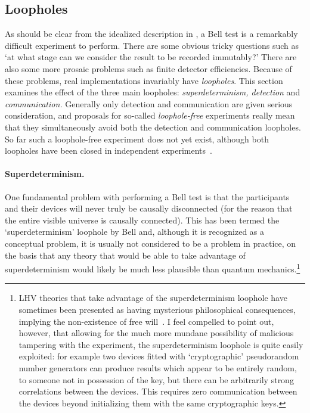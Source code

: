 \subsection{Loopholes}\label{sec:loopholes}
As should be clear from the idealized description in , a Bell test is a remarkably difficult experiment to perform. There are some obvious tricky questions such as `at what stage can we consider the result to be recorded immutably?' There are also some more prosaic problems such as finite detector efficiencies. Because of these problems, real implementations invariably have \emph{loopholes}. This section examines the effect of the three main loopholes: \emph{superdeterminism, detection} and \emph{communication.} Generally only detection and communication are given serious consideration, and proposals for so-called \emph{loophole-free} experiments really mean that they simultaneously avoid both the detection and communication loopholes. So far such a loophole-free experiment does not yet exist, although both loopholes have been closed in independent experiments~\cite{rowe_experimental_2001, weihs_violation_1998}.

\paragraph{Superdeterminism.} One fundamental problem with performing a Bell test is that the participants and their devices will never truly be causally disconnected (for the reason that the entire visible universe is causally connected). This has been termed the `superdeterminism' loophole by Bell and, although it is recognized as a conceptual problem, it is usually not considered to be a problem in practice, on the basis that any theory that would be able to take advantage of superdeterminism would likely be much less plausible than quantum mechanics.\footnote{LHV theories that take advantage of the superdeterminism loophole have sometimes been presented as having mysterious philosophical consequences, implying the non-existence of free will~\cite{bell_cuisine}. I feel compelled to point out, however, that allowing for the much more mundane possibility of malicious tampering with the experiment, the superdeterminism loophole is quite easily exploited: for example two devices fitted with `cryptographic' pseudorandom number generators can produce results which appear to be entirely random, to someone not in possession of the key, but there can be arbitrarily strong correlations between the devices. This requires zero communication between the devices beyond initializing them with the same cryptographic keys.}

